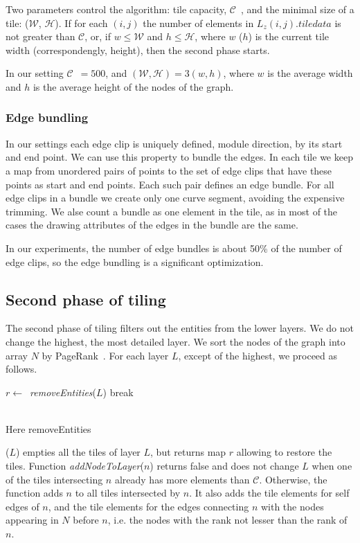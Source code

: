 \documentclass{gd-llncs}
\newcommand{\capac}{$\mathcal{C}$}
\newcommand{\mw}{$\mathcal{W}$}
\newcommand{\mh}{$\mathcal{H}$}
\begin{document}
{Two parameters control the algorithm: tile capacity, \capac~, and the minimal size of a tile: (\mw, \mh).
If for each $(i,j)$ the number of elements in $L_z(i,j).\textit{tiledata}$ is not greater than \capac, or, if $w \leq \mathcal{W}$ and $h \leq \mathcal{H}$, where $w$ ($h$) is the current tile width (correspondengly, height), then the second phase starts.

In our setting \capac~$=500$, and $(\mathcal{W},\mathcal{H}) = 3(w,h)$, where $w$ is the average width and $h$ is the average height of the nodes of the graph.
\subsubsection*{Edge bundling}
In our settings each edge clip is uniquely defined, module direction, by its start and end point. We can use this property to bundle the edges. In each tile we keep a map from unordered pairs of points to the set of edge clips that have these points as start and end points. Each such pair defines an edge bundle. For all edge clips in a bundle we create only one curve segment, avoiding the expensive trimming. We alse count a bundle as one element in the tile, as in most of the cases the drawing attributes of the edges in the bundle are the same.

In our experiments, the number of edge bundles is about 50\% of the number of edge clips, so the edge bundling is a significant optimization.

\subsection*{Second phase of tiling}
The second phase of tiling filters out the entities from the lower layers. We do not change the highest, the most detailed layer.
We sort the nodes of the graph into array $N$ by PageRank~\cite{page1999pagerank}. For each layer $L$, except of the highest, we proceed as follows.
\begin{algorithm}
  \begin{algorithmic}[1]
    \State $r \gets$~\textit{removeEntities}($L$)
    {break}
    \EndIf
    \EndFor
    \EndProcedure
  \end{algorithmic}
\end{algorithm}\\
Here removeEntities}($L$) empties all the tiles of layer $L$, but returns map $r$ allowing to restore the tiles. Function \textit{addNodeToLayer}($n$) returns false and does not change $L$ when one of the tiles intersecting $n$ already has more elements than \capac. Otherwise, the function adds $n$ to all tiles intersected by $n$. It also adds the tile elements for self edges of $n$, and the tile elements for the edges connecting $n$ with the nodes appearing in $N$ before $n$, i.e. the nodes with the rank not lesser than the rank of $n$.
\end{document}
